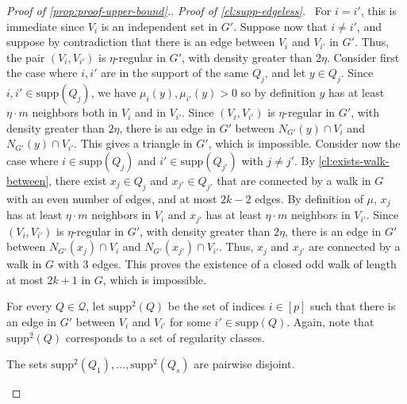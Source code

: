 \documentclass{article}
\newcommand{\supp}{\text{supp}}
\newcommand{\mydiamond}{\rotatebox[origin=c]{45}{$\vcenter{\hbox{$\Box$}}$}}
\newenvironment{subproof}[1]{\par\noindent \textit{Proof of #1.}\ }{\hfill \mydiamond \par\vspace{11pt}}
\begin{document}
\begin{proof}[Proof of \cref{prop:proof-upper-bound}.]
    \begin{subproof}{\cref{cl:supp-edgeless}}
        For $i = i'$, this is immediate since $V_i$ is an independent set in $G'$.
        Suppose now that $i \neq i'$, and suppose by contradiction that there is an edge between $V_i$ and $V_{i'}$ in $G'$.
        Thus, the pair $(V_i, V_{i'})$ is $\eta$-regular in $G'$, with density greater than $2\eta$.
        Consider first the case where $i, i'$ are in the support of the same $Q_j$, and let $y \in Q_j$.
        Since $i, i' \in \supp(Q_j)$, we have $\mu_i(y), \mu_{i'}(y) > 0$ so by definition $y$ has at least $\eta \cdot m$ neighbors both in $V_i$ and in $V_{i'}$.
        Since $(V_i, V_{i'})$ is $\eta$-regular in $G'$, with density greater than $2\eta$, there is an edge in $G'$ between $N_{G'}(y) \cap V_i$ and $N_{G'}(y) \cap V_{i'}$. 
        This gives a triangle in $G'$, which is impossible.
        Consider now the case where $i \in \supp(Q_j)$ and $i' \in \supp(Q_{j'})$ with $j \neq j'$.
        By \cref{cl:exists-walk-between}, there exist $x_j \in Q_j$ and $x_{j'} \in Q_{j'}$ that are connected by a walk in $G$ with an even number of edges, and at most $2k-2$ edges.
        By definition of $\mu$, $x_j$ has at least $\eta \cdot m$ neighbors in $V_i$ and $x_{j'}$ has at least $\eta \cdot m$ neighbors in $V_{i'}$.
        Since $(V_i, V_{i'})$ is $\eta$-regular in $G'$, with density greater than $2\eta$, there is an edge in $G'$ between $N_{G'}(x_j) \cap V_i$ and $N_{G'}(x_{j'}) \cap V_{i'}$.
        Thus, $x_j$ and $x_{j'}$ are connected by a walk in $G$ with $3$ edges.
        This proves the existence of a closed odd walk of length at most $2k+1$ in $G$, which is impossible.
    \end{subproof}

    For every $Q \in \mathcal{Q}$, let $\supp^2(Q)$ be the set of indices $i \in [p]$ such that there is an edge in $G'$ between $V_i$ and $V_{i'}$ for some $i' \in \supp(Q)$.
    Again, note that $\supp^2(Q)$ corresponds to a set of regularity classes.

    \begin{claim}\label{cl:supp2-disjoint}
        The sets $\supp^2(Q_1), \ldots, \supp^2(Q_{s})$ are pairwise disjoint.
    \end{claim}


\end{proof}
\end{document}
